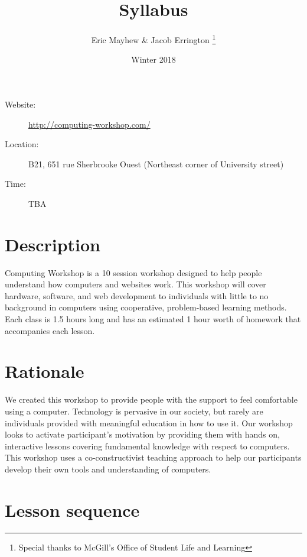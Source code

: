 \documentclass[11pt]{article}
\author{%
  Eric Mayhew \& Jacob Errington%
  \footnote{Special thanks to McGill's Office of Student Life and Learning}
}
\title{Syllabus}
\date{Winter 2018}
\begin{document}
\maketitle

\begin{description}
  \item[Website:]
    \url{http://computing-workshop.com/}

  \item[Location:]
    B21, 651 rue Sherbrooke Ouest
    (Northeast corner of University street)

  \item[Time:]
    TBA
\end{description}

\section*{Description}

Computing Workshop is a 10 session workshop designed to help people understand
how computers and websites work. This workshop will cover hardware, software,
and web development to individuals with little to no background in computers
using cooperative, problem-based learning methods. Each class is 1.5 hours long
and has an estimated 1 hour worth of homework that accompanies each lesson.

\section*{Rationale}

We created this workshop to provide people with the support to feel comfortable
using a computer. Technology is pervasive in our society, but rarely are
individuals provided with meaningful education in how to use it. Our workshop
looks to activate participant's motivation by providing them with hands on,
interactive lessons covering fundamental knowledge with respect to computers.
This workshop uses a co-constructivist teaching approach to help our
participants develop their own tools and understanding of computers.

\section{Lesson sequence}
\end{document}
